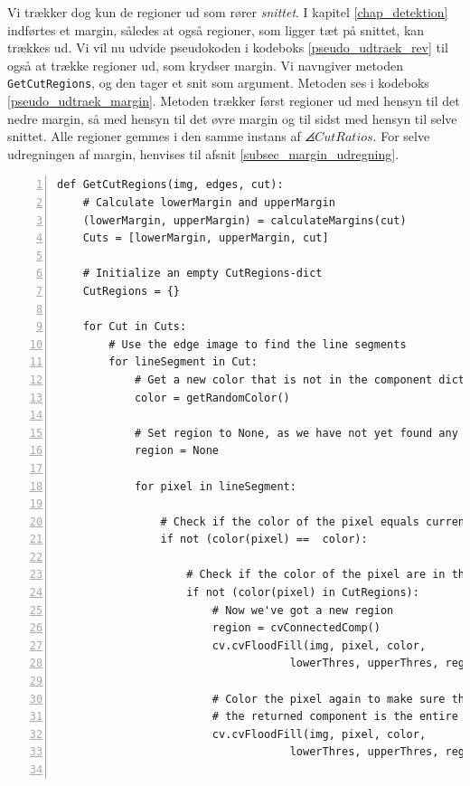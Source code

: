 {Vi trækker dog kun de regioner ud som rører \emph{snittet}. I kapitel
\ref{chap_detektion} indførtes et margin, således at også regioner, som
ligger tæt på snittet, kan trækkes ud. Vi vil nu udvide pseudokoden i
kodeboks \ref{pseudo_udtraek_rev} til også at trække regioner ud, som
krydser margin. Vi navngiver metoden \texttt{GetCutRegions}, og den
tager et snit som argument. Metoden ses i kodeboks
\ref{pseudo_udtraek_margin}. Metoden trækker først regioner ud med
hensyn til det nedre margin, så med hensyn til det øvre margin og til
sidst med hensyn til selve snittet. Alle regioner gemmes i den samme
instans af $\angles{CutRatios}$. For selve udregningen af margin,
henvises til afsnit \ref{subsec_margin_udregning}.

\begin{lstlisting}[caption={Pseudokode til udtrækning af regioner med
    margin.},captionpos=b,label={pseudo_udtraek_margin},numbers=left,
    frame=tb, breaklines=false, float=h]
def GetCutRegions(img, edges, cut):
    # Calculate lowerMargin and upperMargin
    (lowerMargin, upperMargin) = calculateMargins(cut)
    Cuts = [lowerMargin, upperMargin, cut]

    # Initialize an empty CutRegions-dict
    CutRegions = {}

    for Cut in Cuts:
        # Use the edge image to find the line segments
        for lineSegment in Cut:
            # Get a new color that is not in the component dictionary
            color = getRandomColor()

            # Set region to None, as we have not yet found any
            region = None

            for pixel in lineSegment:

                # Check if the color of the pixel equals current color
                if not (color(pixel) ==  color):

                    # Check if the color of the pixel are in the saved regions
                    if not (color(pixel) in CutRegions):
                        # Now we've got a new region
                        region = cvConnectedComp()
                        cv.cvFloodFill(img, pixel, color,
                                    lowerThres, upperThres, region)

                        # Color the pixel again to make sure that
                        # the returned component is the entire region
                        cv.cvFloodFill(img, pixel, color,
                                    lowerThres, upperThres, region)


\end{lstlisting}}
